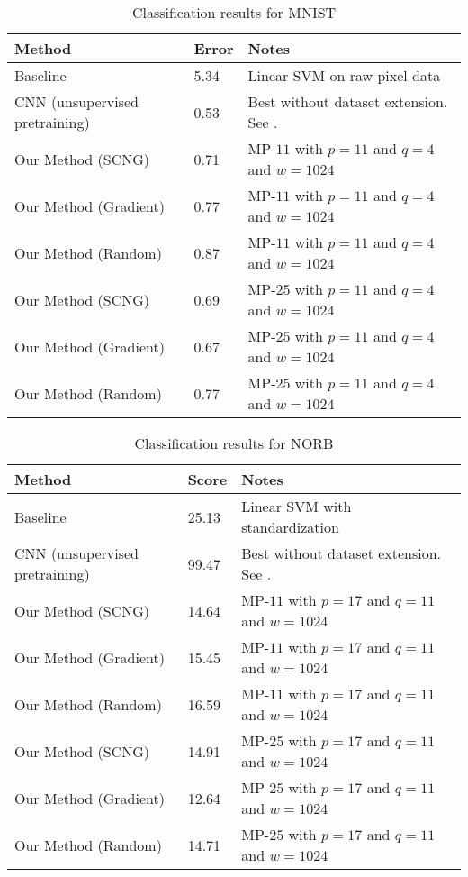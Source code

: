 \documentclass[runningheads,a4paper]{llncs}
\begin{document}
\renewcommand{\arraystretch}{1.2}
\begin{table}
  \caption{Classification results for MNIST}
  \label{table:ResultsMNIST}
  \begin{tabularx}{\textwidth}{|l|l|X|}
    \hline
    \textbf{Method} & \textbf{Error} & \textbf{Notes} \\ \hline\hline
    Baseline & 5.34 & Linear SVM on raw pixel data \\ \hline
    CNN (unsupervised pretraining) & 0.53 & Best without dataset extension. See \cite{best-architecture-object-recognition}. \\ \hline
    Our Method (SCNG) & 0.71 & MP-$11$ with $p=11$ and $q=4$ and $w=1024$ \\ \hline
    Our Method (Gradient) & 0.77 & MP-$11$ with $p=11$ and $q=4$ and $w=1024$ \\ \hline
    Our Method (Random) & 0.87 & MP-$11$ with $p=11$ and $q=4$ and $w=1024$ \\ \hline
    Our Method (SCNG) & 0.69 & MP-$25$ with $p=11$ and $q=4$ and $w=1024$ \\ \hline
    Our Method (Gradient) & 0.67 & MP-$25$ with $p=11$ and $q=4$ and $w=1024$ \\ \hline
    Our Method (Random) & 0.77 & MP-$25$ with $p=11$ and $q=4$ and $w=1024$ \\ \hline
  \end{tabularx}
\end{table}
\renewcommand{\arraystretch}{1.0}

\renewcommand{\arraystretch}{1.2}
\begin{table}
  \caption{Classification results for NORB}
  \label{table:ResultsNORB}
  \begin{tabularx}{\textwidth}{|l|l|X|}
    \hline
    \textbf{Method} & \textbf{Score} & \textbf{Notes} \\ \hline\hline
    Baseline & 25.13 & Linear SVM with standardization \\ \hline
    CNN (unsupervised pretraining) & 99.47 & Best without dataset extension. See \cite{best-architecture-object-recognition}. \\ \hline
    Our Method (SCNG) & 14.64 & MP-$11$ with $p=17$ and $q=11$ and $w=1024$ \\ \hline
    Our Method (Gradient) & 15.45 & MP-$11$ with $p=17$ and $q=11$ and $w=1024$ \\ \hline
    Our Method (Random) & 16.59 & MP-$11$ with $p=17$ and $q=11$ and $w=1024$ \\ \hline
    Our Method (SCNG) & 14.91 & MP-$25$ with $p=17$ and $q=11$ and $w=1024$ \\ \hline
    Our Method (Gradient) & 12.64 & MP-$25$ with $p=17$ and $q=11$ and $w=1024$ \\ \hline
    Our Method (Random) & 14.71 & MP-$25$ with $p=17$ and $q=11$ and $w=1024$ \\ \hline
  \end{tabularx}
\end{table}
\renewcommand{\arraystretch}{1.0}
\end{document}

